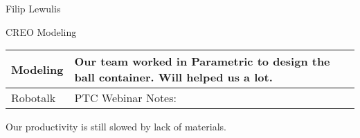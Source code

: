 Filip Lewulis

CREO Modeling 

\begin{tabular}{|p{5cm}|p{5cm}|}
  \hline
  Modeling&
  Our team worked in Parametric to design the ball container. Will helped us a lot.\\
  \hline
  Robotalk&
  PTC Webinar Notes:
  
  
  
  \\
  \hline
\end{tabular}

Our productivity is still slowed by lack of materials.
  
